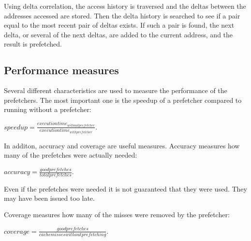Using delta correlation, the access history is traversed and the
deltas between the addresses accessed are stored. Then the delta
history is searched to see if a pair equal to the most recent pair
of deltas exists. If such a pair is found, the next delta, or
several of the next deltas, are added to the current address,
and the result is prefetched.

\subsection{Performance measures}
Several different characteristics are used to measure the performance
of the prefetchers. The most important one is the speedup of a
prefetcher compared to running without a prefetcher:

$speedup = \frac{execution time_{without prefetcher}}{execution time_{with prefetcher}}$.

In additon, accuracy and coverage are useful measures. Accuracy measures
how many of the prefetches were actually needed:

$accuracy = \frac{good prefetches}{total prefetches}$.

Even if the prefetches were needed it is not guaranteed that they
were used. They may have been issued too late.

Coverage measures how many of the misses were removed by the
prefetcher:

$coverage = \frac{good prefetches}{cache misses without prefetching}$.

\cite{bib:doc}
